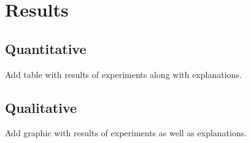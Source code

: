 \chapter{Results} \label{ch:ch4}

\section{Quantitative}
Add table with results of experiments along with explanations.

\section{Qualitative}
Add graphic with results of experiments as well as explanations.